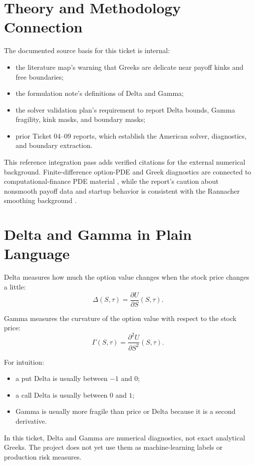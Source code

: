 \documentclass[11pt,a4paper]{article}
\begin{document}
\section{Theory and Methodology Connection}

The documented source basis for this ticket is internal:
\begin{itemize}
  \item the literature map's warning that Greeks are delicate near payoff kinks and free boundaries;
  \item the formulation note's definitions of Delta and Gamma;
  \item the solver validation plan's requirement to report Delta bounds, Gamma fragility, kink masks, and boundary masks;
  \item prior Ticket 04--09 reports, which establish the American solver, diagnostics, and boundary extraction.
\end{itemize}

This reference integration pass adds verified citations for the external numerical background.
Finite-difference option-PDE and Greek diagnostics are connected to computational-finance PDE
material \citep{wilmott_howison_dewynne_1995}, while the report's caution about nonsmooth payoff
data and startup behavior is consistent with the Rannacher smoothing background
\citep{rannacher_1984}.

\section{Delta and Gamma in Plain Language}

Delta measures how much the option value changes when the stock price changes a little:
\[
\Delta(S,\tau) = \frac{\partial U}{\partial S}(S,\tau).
\]

Gamma measures the curvature of the option value with respect to the stock price:
\[
\Gamma(S,\tau) = \frac{\partial^2 U}{\partial S^2}(S,\tau).
\]

For intuition:
\begin{itemize}
  \item a put Delta is usually between \(-1\) and \(0\);
  \item a call Delta is usually between \(0\) and \(1\);
  \item Gamma is usually more fragile than price or Delta because it is a second derivative.
\end{itemize}

In this ticket, Delta and Gamma are numerical diagnostics, not exact analytical Greeks. The
project does not yet use them as machine-learning labels or production risk measures.
\end{document}
